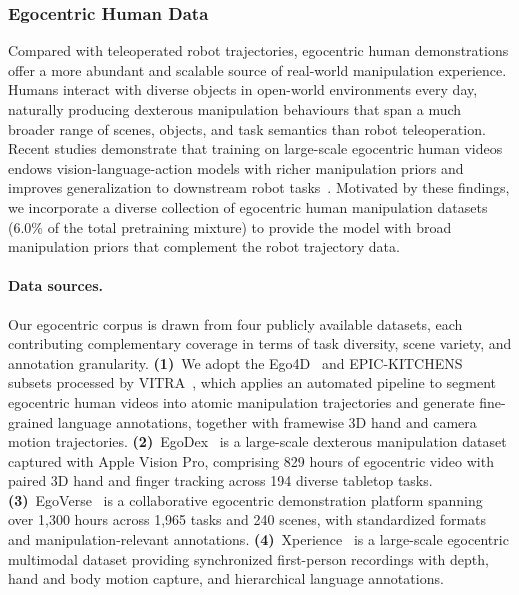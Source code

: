 \documentclass{llmxive}
\begin{document}
\subsubsection{Egocentric Human Data}
\label{sec:ego-data}

Compared with teleoperated robot trajectories, egocentric human demonstrations
offer a more abundant and scalable source of real-world manipulation
experience.
Humans interact with diverse objects in open-world environments every day,
naturally producing dexterous manipulation behaviours that span a much broader
range of scenes, objects, and task semantics than robot teleoperation.
Recent studies demonstrate that training on large-scale egocentric human videos endows vision-language-action models with richer manipulation priors and improves generalization to downstream robot tasks~\citep{kareer2025egomimic,luo2025beingh0,li2025vitra,luo2026beingh05,zheng2026egoscale,hu2026finevlafinegrainedinstructionalignment}.
Motivated by these findings, we incorporate a diverse collection of egocentric
human manipulation datasets (6.0\% of the total pretraining mixture) to
provide the model with broad manipulation priors that complement the robot
trajectory data.

\paragraph{Data sources.}
Our egocentric corpus is drawn from four publicly available datasets, each
contributing complementary coverage in terms of task diversity, scene variety,
and annotation granularity. %
%
\textbf{(1)}~We adopt the Ego4D~\citep{grauman2022ego4d} and
EPIC-KITCHENS~\citep{damen2022rescaling} subsets processed by
VITRA~\citep{li2025vitra}, which applies an automated pipeline to segment egocentric human videos into atomic manipulation trajectories and generate fine-grained language annotations, together with framewise 3D hand
and camera motion trajectories.
%
\textbf{(2)}~EgoDex~\citep{hoque2026egodex} is a large-scale dexterous manipulation dataset captured with Apple Vision Pro, comprising 829 hours of egocentric video with paired 3D hand and finger tracking across 194 diverse
tabletop tasks.
%
\textbf{(3)}~EgoVerse~\citep{punamiya2026egoverse} is a collaborative egocentric demonstration platform spanning over 1{,}300 hours across 1{,}965 tasks and 240 scenes, with standardized formats and manipulation-relevant annotations.
%
\textbf{(4)}~Xperience~\citep{ropedia2026xperience} is a large-scale egocentric multimodal dataset providing synchronized first-person recordings with depth, hand and body motion capture, and hierarchical language annotations.
\end{document}
